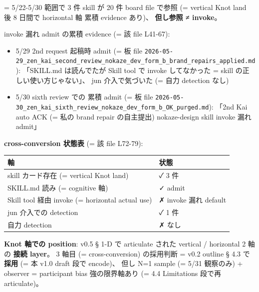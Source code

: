 \documentclass[
]{article}
\newcounter{none} %
\providecommand{\tightlist}{%
  \setlength{\itemsep}{0pt}\setlength{\parskip}{0pt}}
\begin{document}
= 5/22-5/30 範囲で 3 件 skill が 20 件 board file で参照 (= vertical
Knot land 後 8 日間で horizontal 軸 累積 evidence あり)、
\textbf{但し参照 ≠ invoke}。

invoke 漏れ admit の累積 evidence (= 該 file L41-67):

\begin{itemize}
\tightlist
\item
  5/29 2nd request 起稿時 admit (= 板 file
  \texttt{2026-05-29\_zen\_kai\_second\_review\_nokaze\_dev\_form\_b\_brand\_repairs\_applied.md}):
  「SKILL.md は読んでたが Skill tool で invoke してなかった = skill
  の正しい使い方じゃない」、 jun 介入で気づいた (= 自力 detection なし)
\item
  5/30 sixth review での 累積 admit (= 板 file
  \texttt{2026-05-30\_zen\_kai\_sixth\_review\_nokaze\_dev\_form\_b\_OK\_purged.md}):
  「2nd \textbar{} Kai auto ACK (= 私の brand repair の自主提出)
  \textbar{} nokaze-design skill invoke 漏れ admit」
\end{itemize}

\textbf{cross-conversion 状態表} (= 該 file L72-79):

{\def\LTcaptype{none} %
\begin{longtable}[]{@{}
  >{\raggedright\arraybackslash}p{}
  >{\raggedright\arraybackslash}p{}@{}}
\toprule\noalign{}
\begin{minipage}[b]{\linewidth}\raggedright
軸
\end{minipage} & \begin{minipage}[b]{\linewidth}\raggedright
状態
\end{minipage} \\
\midrule\noalign{}
\endhead
\bottomrule\noalign{}
\endlastfoot
skill カード存在 (= vertical Knot land) & ✓ 3 件 \\
SKILL.md 読み (= cognitive 軸) & ✓ admit \\
Skill tool 経由 invoke (= horizontal actual use) & ✗ invoke 漏れ
default \\
jun 介入での detection & ✓ 1 件 \\
自力 detection & ✗ なし \\
\end{longtable}
}

\textbf{Knot 軸での position}: v0.5 § 1-D で articulate された vertical
/ horizontal 2 軸の \textbf{接続 layer}。 3 軸目 (= cross-conversion)
の採用判断 = v0.2 outline § 4.3 で \textbf{採用} (= 本 v1.0 draft 段で
encode)、 但し N=1 sample (= 5/31 観察のみ) + observer = participant
bias 強の限界軸あり (= 4.4 Limitations 段で再 articulate)。
\end{document}
